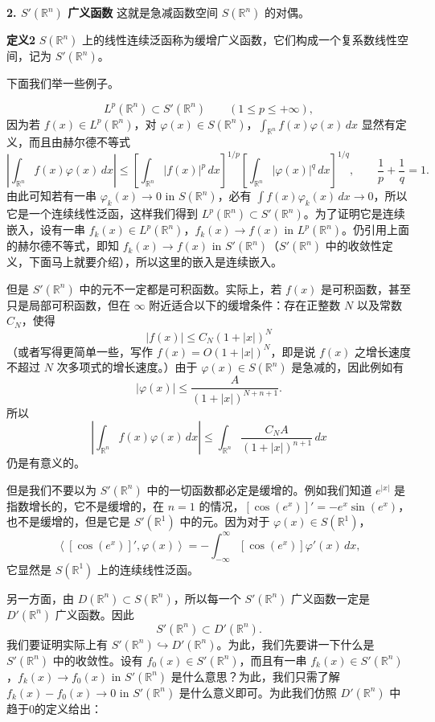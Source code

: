 \noindent\textbf{2. $S'(\mathbb R^n)$ 广义函数}\quad
这就是急减函数空间 $S(\mathbb R^n)$ 的对偶。

\noindent\textbf{定义2}\quad
$S(\mathbb R^n)$ 上的线性连续泛函称为缓增广义函数，它们构成一个复系数线性空间，记为 $S'(\mathbb R^n)$。

下面我们举一些例子。

\[
 L^p(\mathbb R^n)\subset S'(\mathbb R^n)\qquad(1\le p\le+\infty),
\]
因为若 $f(x)\in L^p(\mathbb R^n)$，对 $\varphi(x)\in S(\mathbb R^n)$，$\int_{\mathbb R^n}f(x)\varphi(x)\,dx$ 显然有定义，而且由赫尔德不等式
\[
 \left|\int_{\mathbb R^n}f(x)\varphi(x)\,dx\right|
 \le\left[\int_{\mathbb R^n}|f(x)|^p\,dx\right]^{1/p}
 \left[\int_{\mathbb R^n}|\varphi(x)|^q\,dx\right]^{1/q},
 \qquad \frac1p+\frac1q=1.
\]
由此可知若有一串 $\varphi_k(x)\to0$ in $S(\mathbb R^n)$，必有 $\int f(x)\varphi_k(x)\,dx\to0$，所以它是一个连续线性泛函，这样我们得到 $L^p(\mathbb R^n)\subset S'(\mathbb R^n)$。为了证明它是连续嵌入，设有一串 $f_k(x)\in L^p(\mathbb R^n)$，$f_k(x)\to f(x)$ in $L^p(\mathbb R^n)$。仍引用上面的赫尔德不等式，即知 $f_k(x)\to f(x)$ in $S'(\mathbb R^n)$（$S'(\mathbb R^n)$ 中的收敛性定义，下面马上就要介绍），所以这里的嵌入是连续嵌入。

但是 $S'(\mathbb R^n)$ 中的元不一定都是可积函数。实际上，若 $f(x)$ 是可积函数，甚至只是局部可积函数，但在 $\infty$ 附近适合以下的缓增条件：存在正整数 $N$ 以及常数 $C_N$，使得
\[
 |f(x)|\le C_N(1+|x|)^N
\]
（或者写得更简单一些，写作 $f(x)=O(1+|x|)^N$，即是说 $f(x)$ 之增长速度不超过 $N$ 次多项式的增长速度。）由于 $\varphi(x)\in S(\mathbb R^n)$ 是急减的，因此例如有
\[
 |\varphi(x)|\le\frac{A}{(1+|x|)^{N+n+1}}.
\]
所以
\[
 \left|\int_{\mathbb R^n}f(x)\varphi(x)\,dx\right|
 \le\int_{\mathbb R^n}\frac{C_NA}{(1+|x|)^{n+1}}\,dx
\]
仍是有意义的。

但是我们不要以为 $S'(\mathbb R^n)$ 中的一切函数都必定是缓增的。例如我们知道 $e^{|x|}$ 是指数增长的，它不是缓增的，在 $n=1$ 的情况，$[\cos(e^x)]'=-e^x\sin(e^x)$，也不是缓增的，但是它是 $S'(\mathbb R^1)$ 中的元。因为对于 $\varphi(x)\in S(\mathbb R^1)$，
\[
 \left\langle[\cos(e^x)]',\varphi(x)\right\rangle
 =-\int_{-\infty}^{\infty}[\cos(e^x)]\varphi'(x)\,dx,
\]
它显然是 $S(\mathbb R^1)$ 上的连续线性泛函。

另一方面，由 $D(\mathbb R^n)\subset S(\mathbb R^n)$，所以每一个 $S'(\mathbb R^n)$ 广义函数一定是 $D'(\mathbb R^n)$ 广义函数。因此
\[
 S'(\mathbb R^n)\subset D'(\mathbb R^n).
\]
我们要证明实际上有 $S'(\mathbb R^n)\hookrightarrow D'(\mathbb R^n)$。为此，我们先要讲一下什么是 $S'(\mathbb R^n)$ 中的收敛性。设有 $f_0(x)\in S'(\mathbb R^n)$，而且有一串 $f_k(x)\in S'(\mathbb R^n)$，$f_k(x)\to f_0(x)$ in $S'(\mathbb R^n)$ 是什么意思？为此，我们只需了解 $f_k(x)-f_0(x)\to0$ in $S'(\mathbb R^n)$ 是什么意义即可。为此我们仿照 $D'(\mathbb R^n)$ 中趋于0的定义给出：


